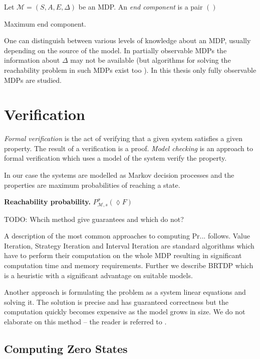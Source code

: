 \begin{definition}
Let $\mathcal{M} = (S, A, E, \Delta)$ be an MDP. An {\em end component}
is a pair $()$


Maximum end component.
\end{definition}

One can distinguish between various levels of knowledge about an MDP,
usually depending on the source of the model.
In partially observable MDPs the information about $\Delta$ may not be
available (but algorithms for solving the reachability
problem in such MDPs exist too \parencite{atva14}). In this thesis only
fully observable MDPs are studied.


\section{Verification}

{\em Formal verification} is the act of verifying that a given system satisfies
a given property. The result of a verification is a proof. {\em Model
checking} is an approach to formal verification which uses a model of
the system verify the property.

In our case the systems are modelled as Markov decision processes and
the properties are maximum probabilities of reaching a state.

\noindent \textbf{Reachability probability.}
$P^\sigma_{\mathcal{M},s}(\lozenge F)$

TODO: Whcih method give guarantees and which do not?

A description of the most common approaches to computing Pr... follows.
Value Iteration, Strategy Iteration and Interval Iteration are
standard algorithms which have to perform their computation on the
whole MDP resulting in significant computation time and memory
requirements. Further we describe BRTDP which is a heuristic with a
significant advantage on suitable models.

Another approach is formulating the problem as a system linear equations
and solving it. The solution is precise and has guaranteed correctness
but the computation quickly becomes expensive as the model grows in
size. We do not elaborate on this method -- the reader is referred to
\parencite{forejt}.

\subsection*{Computing Zero States}

